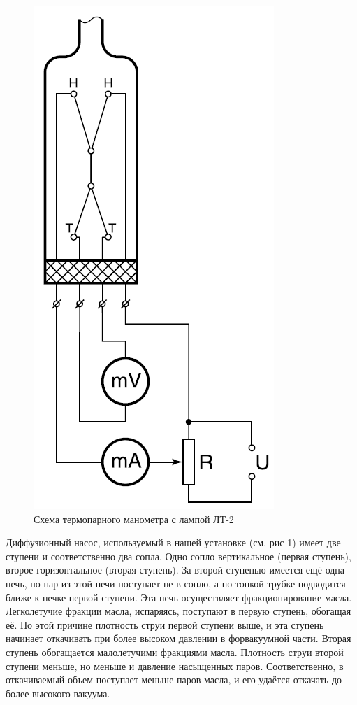 \documentclass[a4paper, 12pt]{article}
\begin{document}
\begin{figure}
 	\begin{center}
 		\includegraphics[width=0.8\linewidth]{6.png}
 		\caption{Схема термопарного манометра с лампой ЛТ-2}
 		\label{fig:Схема термопары}
 	\end{center}
 \end{figure}
 
Диффузионный насос, используемый в нашей установке (см. рис 1) имеет две ступени и соответственно два сопла. Одно сопло вертикальное (первая ступень), второе горизонтальное (вторая ступень). За второй ступенью имеется ещё одна печь, но пар из этой печи поступает не в сопло, а по тонкой трубке подводится ближе к печке первой ступени.
Эта печь осуществляет фракционирование масла. Легколетучие фракции масла, испаряясь, поступают в первую ступень, обогащая её. По этой причине плотность струи первой ступени выше, и эта ступень начинает откачивать при более высоком давлении в форвакуумной части. Вторая ступень обогащается малолетучими фракциями масла. Плотность струи второй ступени меньше, но меньше и давление насыщенных паров. Соответственно, в откачиваемый объем поступает меньше паров масла, и его удаётся откачать до более высокого вакуума.  \\
 
\end{document}
